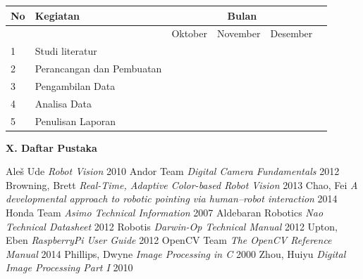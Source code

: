 \documentclass[a4paper,12pt]{article}
\begin{document}
\begin{center}
 \begin{tabular}{ |l|l|l|l|l|l| }
   \hline
   No & Kegiatan & \multicolumn{3}{|c|}{Bulan} \\
   \hline
     &  & Oktober & November & Desember \\
   \hline
   1 & Studi literatur & \cellcolor{blue} & \cellcolor{blue} & \\
   \hline
   2 & Perancangan dan Pembuatan & \cellcolor{blue} & \cellcolor{blue} & \\
   \hline
   3 & Pengambilan Data & & \cellcolor{blue} & \cellcolor{blue} \\
   \hline
   4 & Analisa Data & & & \cellcolor{blue} \\
   \hline
   5 & Penulisan Laporan & & \cellcolor{blue} & \cellcolor{blue} \\
  \hline
\end{tabular}
\end{center}

\vspace{10pt}
\noindent \textbf{X. \hspace{9pt} Daftar Pustaka} 

\begingroup
  \renewcommand{\section}[2]{}%
    \begin{thebibliography}{}
	 Aleš Ude \textit{Robot Vision} 2010
	 Andor Team \textit{Digital Camera Fundamentals} 2012
	 Browning, Brett \textit{Real-Time, Adaptive Color-based Robot Vision} 2013
	 Chao, Fei \textit{A developmental approach to robotic pointing via human–robot interaction} 2014
	 Honda Team \textit{Asimo Technical Information} 2007
	 Aldebaran Robotics \textit{Nao Technical Datasheet} 2012
	 Robotis \textit{Darwin-Op Technical Manual} 2012
	 Upton, Eben \textit{RaspberryPi User Guide} 2012
	 OpenCV Team \textit{The OpenCV Reference Manual} 2014
	 Phillips, Dwyne \textit{Image Processing in C} 2000
	 Zhou, Huiyu \textit{Digital Image Processing Part I} 2010
    \end{thebibliography}
\endgroup
\end{document}
